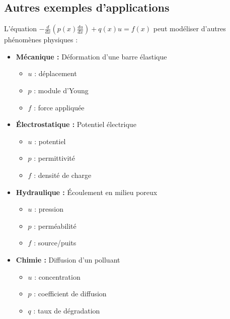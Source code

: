 \documentclass[11pt,a4paper]{report}
\begin{document}
\subsection*{Autres exemples d'applications}

L'équation $- \frac{d}{dx} \left( p(x) \frac{du}{dx} \right) + q(x) u = f(x)$ peut modéliser d'autres phénomènes physiques :

\begin{multicols}{2}
\begin{itemize}[label=]
    \item \textbf{Mécanique :} Déformation d'une barre élastique
    \begin{itemize}[label=$\bullet$]
        \item $u$ : déplacement
        \item $p$ : module d'Young
        \item $f$ : force appliquée
    \end{itemize}
    
    \item \textbf{Électrostatique :} Potentiel électrique
    \begin{itemize}[label=$\bullet$]
        \item $u$ : potentiel
        \item $p$ : permittivité
        \item $f$ : densité de charge
    \end{itemize}
    
    \item \textbf{Hydraulique :} Écoulement en milieu poreux
    \begin{itemize}[label=$\bullet$]
        \item $u$ : pression
        \item $p$ : perméabilité
        \item $f$ : source/puits
    \end{itemize}
    
    \item \textbf{Chimie :} Diffusion d'un polluant
    \begin{itemize}[label=$\bullet$]
        \item $u$ : concentration
        \item $p$ : coefficient de diffusion
        \item $q$ : taux de dégradation
    \end{itemize}
\end{itemize}
\end{multicols}
\end{document}

